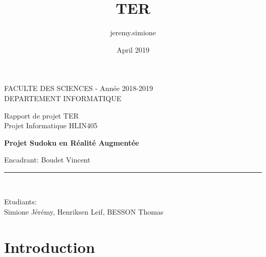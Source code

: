 \documentclass{article}
\title{TER}
\author{jeremy.simione }
\date{April 2019}
\begin{document}
\begin{titlepage}

\begin{center}
\vspace*{-1in}
\begin{figure}[htb]
\begin{center}
\end{center}
\end{figure}

FACULTE DES SCIENCES - Année 2018-2019\\
\vspace*{0.15in}
DEPARTEMENT INFORMATIQUE \\
\vspace*{0.4in}
\begin{large}
Rapport de projet TER \\
Projet Informatique HLIN405\\
\end{large}
\vspace*{0.2in}
\begin{Large}
\textbf{Projet Sudoku en Réalité Augmentée} \\
\end{Large}
\vspace*{0.3in}
\begin{large}
Encadrant:
Boudet Vincent
 \\
\end{large}
\vspace*{0.3in}
\rule{80mm}{0.1mm}\\
\vspace*{0.1in}
\begin{large}
Etudiants: \\
Simione Jérémy, Henriksen Leif, BESSON Thomas \\
 
\end{large}
\end{center}
\end{titlepage}

\newcommand{\CC}{C\nolinebreak\hspace{-.05em}\raisebox{.4ex}{\tiny\bf +}\nolinebreak\hspace{-.10em}\raisebox{.4ex}{\tiny\bf +}}
\def\CC{{C\nolinebreak[4]\hspace{-.05em}\raisebox{.4ex}{\tiny\bf ++}}}

\tableofcontents
\newpage

\section{Introduction}
\end{document}
